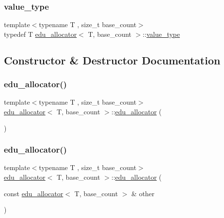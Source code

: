 \subsubsection{\texorpdfstring{value\+\_\+type}{value\_type}}
{\footnotesize\ttfamily template$<$typename T , size\+\_\+t base\+\_\+count$>$ \\
typedef T \hyperlink{classedu__allocator}{edu\+\_\+allocator}$<$ T, base\+\_\+count $>$\+::\hyperlink{classedu__allocator_ac2a6b2105b188c027d63daa51068f991}{value\+\_\+type}}



\subsection{Constructor \& Destructor Documentation}
\mbox{\label{classedu__allocator_a1f4ffbfc259ed45c33bf568d4d80c77e}} 
\subsubsection{\texorpdfstring{edu\+\_\+allocator()}{edu\_allocator()}\hspace{0.1cm}{\footnotesize\ttfamily [1/3]}}
{\footnotesize\ttfamily template$<$typename T , size\+\_\+t base\+\_\+count$>$ \\
\hyperlink{classedu__allocator}{edu\+\_\+allocator}$<$ T, base\+\_\+count $>$\+::\hyperlink{classedu__allocator}{edu\+\_\+allocator} (\begin{DoxyParamCaption}{ }\end{DoxyParamCaption})\hspace{0.3cm}{\ttfamily [inline]}}

\mbox{\label{classedu__allocator_a8bb03f4289b7490b96d62852a462bfc5}} 
\subsubsection{\texorpdfstring{edu\+\_\+allocator()}{edu\_allocator()}\hspace{0.1cm}{\footnotesize\ttfamily [2/3]}}
{\footnotesize\ttfamily template$<$typename T , size\+\_\+t base\+\_\+count$>$ \\
\hyperlink{classedu__allocator}{edu\+\_\+allocator}$<$ T, base\+\_\+count $>$\+::\hyperlink{classedu__allocator}{edu\+\_\+allocator} (\begin{DoxyParamCaption}\item[{const \hyperlink{classedu__allocator}{edu\+\_\+allocator}$<$ T, base\+\_\+count $>$ \&}]{other }\end{DoxyParamCaption})\hspace{0.3cm}{\ttfamily [delete]}}

